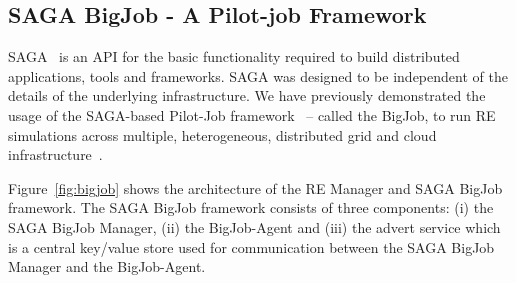 \documentclass{rspublic}
\newcommand{\athotanote}[1]{ {\textcolor{green} { ***athota: #1 }}}
\newcommand{\athotanote}[1]{}
\begin{document}


\subsection{SAGA BigJob - A Pilot-job Framework}
\label{sec:BigJob}


SAGA~\citep{saga-url} %
is an API for the basic functionality required to build distributed
applications, tools and frameworks. SAGA was designed to be independent of the
details of the underlying infrastructure.  We have previously demonstrated the
usage of the SAGA-based Pilot-Job
framework~\citep{saga_bigjob_condor_cloud} -- called the BigJob, to
run RE simulations across multiple, heterogeneous, distributed grid
and cloud infrastructure~\citep{Luckow:2008fp}. 


Figure~\ref{fig:bigjob} shows the architecture of the RE Manager and
SAGA BigJob framework. The SAGA BigJob framework consists of three
components: (i) the SAGA BigJob Manager, (ii) the BigJob-Agent and
(iii) the advert service which is a central key/value store used for
communication between the SAGA BigJob Manager and the BigJob-Agent.
\end{document}
